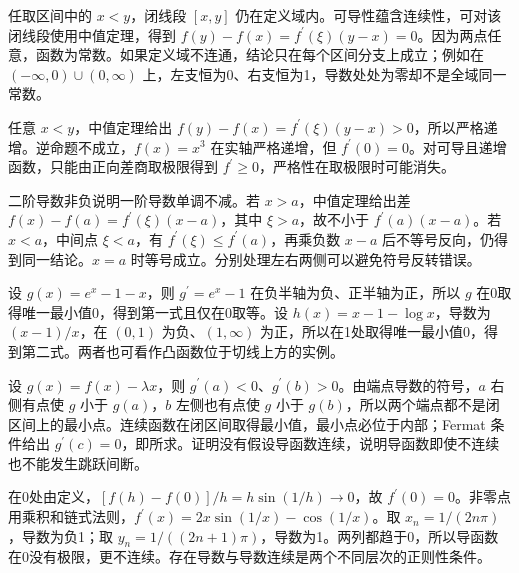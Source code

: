 \documentclass[UTF8,12pt,a4paper,fontset=fandol]{ctexart}
\begin{document}
\begin{solve}\label{ans:c7q11}
任取区间中的 $x<y$，闭线段 $[x,y]$ 仍在定义域内。可导性蕴含连续性，可对该闭线段使用中值定理，得到 $f(y)-f(x)=f^{\prime}(\xi)(y-x)=0$。因为两点任意，函数为常数。如果定义域不连通，结论只在每个区间分支上成立；例如在 $(-\infty,0)\cup(0,\infty)$ 上，左支恒为0、右支恒为1，导数处处为零却不是全域同一常数。
\end{solve}

\begin{solve}\label{ans:c7q12}
任意 $x<y$，中值定理给出 $f(y)-f(x)=f^{\prime}(\xi)(y-x)>0$，所以严格递增。逆命题不成立，$f(x)=x^3$ 在实轴严格递增，但 $f^{\prime}(0)=0$。对可导且递增函数，只能由正向差商取极限得到 $f^{\prime}\ge0$，严格性在取极限时可能消失。
\end{solve}

\begin{solve}\label{ans:c7q13}
二阶导数非负说明一阶导数单调不减。若 $x>a$，中值定理给出差 $f(x)-f(a)=f^{\prime}(\xi)(x-a)$，其中 $\xi>a$，故不小于 $f^{\prime}(a)(x-a)$。若 $x<a$，中间点 $\xi<a$，有 $f^{\prime}(\xi)\le f^{\prime}(a)$，再乘负数 $x-a$ 后不等号反向，仍得到同一结论。$x=a$ 时等号成立。分别处理左右两侧可以避免符号反转错误。
\end{solve}

\begin{solve}\label{ans:c7q14}
设 $g(x)=e^x-1-x$，则 $g^{\prime}=e^x-1$ 在负半轴为负、正半轴为正，所以 $g$ 在0取得唯一最小值0，得到第一式且仅在0取等。设 $h(x)=x-1-\log x$，导数为 $(x-1)/x$，在 $(0,1)$ 为负、$(1,\infty)$ 为正，所以在1处取得唯一最小值0，得到第二式。两者也可看作凸函数位于切线上方的实例。
\end{solve}

\begin{solve}\label{ans:c7q15}
设 $g(x)=f(x)-\lambda x$，则 $g^{\prime}(a)<0$、$g^{\prime}(b)>0$。由端点导数的符号，$a$ 右侧有点使 $g$ 小于 $g(a)$，$b$ 左侧也有点使 $g$ 小于 $g(b)$，所以两个端点都不是闭区间上的最小点。连续函数在闭区间取得最小值，最小点必位于内部；Fermat 条件给出 $g^{\prime}(c)=0$，即所求。证明没有假设导函数连续，说明导函数即使不连续也不能发生跳跃间断。
\end{solve}

\begin{solve}\label{ans:c7q16}
在0处由定义，$[f(h)-f(0)]/h=h\sin(1/h)\to0$，故 $f^{\prime}(0)=0$。非零点用乘积和链式法则，$f^{\prime}(x)=2x\sin(1/x)-\cos(1/x)$。取 $x_n=1/(2n\pi)$，导数为负1；取 $y_n=1/((2n+1)\pi)$，导数为1。两列都趋于0，所以导函数在0没有极限，更不连续。存在导数与导数连续是两个不同层次的正则性条件。
\end{solve}
\end{document}
